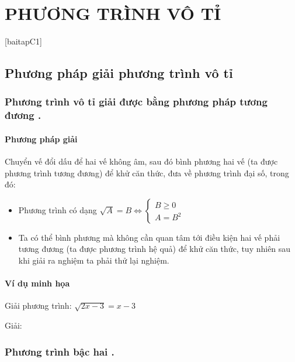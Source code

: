 \part{PHƯƠNG TRÌNH VÔ TỈ}%
\minitoc %

\thispagestyle{empty}
[baitapC1]
\vspace*{1cm}
\chapter{Phương pháp giải phương trình vô tỉ}
\section{Phương trình vô tỉ giải được bằng phương pháp tương đương .}
  \subsection{Phương pháp giải }
    Chuyển vế đổi dấu để hai vế không âm, sau đó bình phương hai vế (ta được phương trình tương đương) để khử căn thức, đưa về phương trình đại số, trong đó: 
        \begin{itemize}
          \item Phương trình có dạng $	\sqrt{A}=B \Leftrightarrow \begin{cases} B \geq 0 \\ A = B^2 \end{cases}$
          \item Ta có thể bình phương mà không cần quan tâm tới điều kiện hai vế phải tương đương (ta được phương trình hệ quả) để khử căn thức, tuy nhiên sau khi giải ra nghiệm ta phải thử lại nghiệm.

        
      
        \end{itemize} 

      \subsection{Ví dụ minh họa}
          \begin{vd}
            Giải phương trình: $ \sqrt{2x-3} = x-3 $

          \end{vd}
          \begin{center}

            Giải:
         \end{center}
\section{Phương trình bậc hai  .}



